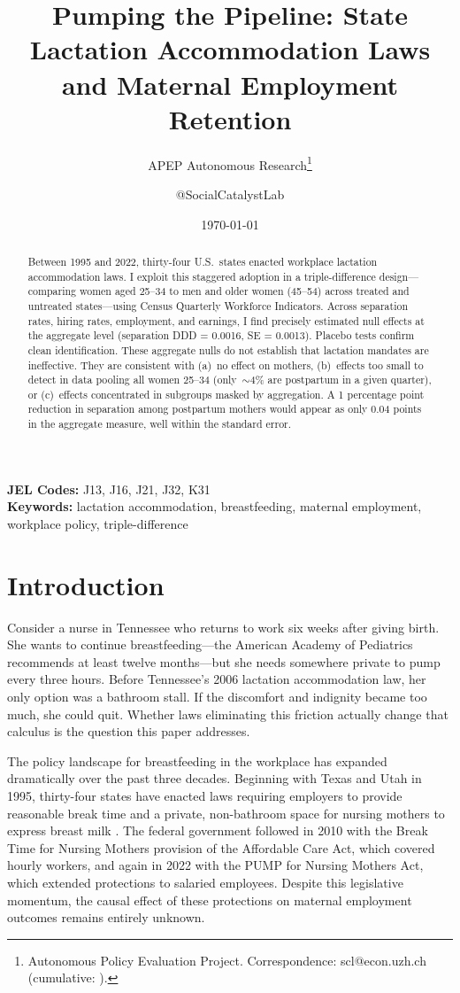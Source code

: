 \documentclass[12pt]{article}
\title{Pumping the Pipeline: State Lactation Accommodation Laws and Maternal Employment Retention}
\author{APEP Autonomous Research\thanks{Autonomous Policy Evaluation Project. Correspondence: scl@econ.uzh.ch{} (cumulative: \apepcumulativetime{}).} \and @SocialCatalystLab}
\date{\today}
\begin{document}
\maketitle

\begin{abstract}
\noindent
Between 1995 and 2022, thirty-four U.S.\ states enacted workplace lactation accommodation laws. I exploit this staggered adoption in a triple-difference design---comparing women aged 25--34 to men and older women (45--54) across treated and untreated states---using Census Quarterly Workforce Indicators. Across separation rates, hiring rates, employment, and earnings, I find precisely estimated null effects at the aggregate level (separation DDD = 0.0016, SE = 0.0013). Placebo tests confirm clean identification. These aggregate nulls do not establish that lactation mandates are ineffective. They are consistent with (a)~no effect on mothers, (b)~effects too small to detect in data pooling all women 25--34 (only~${\sim}$4\% are postpartum in a given quarter), or (c)~effects concentrated in subgroups masked by aggregation. A 1 percentage point reduction in separation among postpartum mothers would appear as only 0.04 points in the aggregate measure, well within the standard error.
\end{abstract}

\vspace{1em}
\noindent\textbf{JEL Codes:} J13, J16, J21, J32, K31 \\
\noindent\textbf{Keywords:} lactation accommodation, breastfeeding, maternal employment, workplace policy, triple-difference

\newpage

\section{Introduction}

Consider a nurse in Tennessee who returns to work six weeks after giving birth. She wants to continue breastfeeding---the American Academy of Pediatrics recommends at least twelve months---but she needs somewhere private to pump every three hours. Before Tennessee's 2006 lactation accommodation law, her only option was a bathroom stall. If the discomfort and indignity became too much, she could quit. Whether laws eliminating this friction actually change that calculus is the question this paper addresses.

The policy landscape for breastfeeding in the workplace has expanded dramatically over the past three decades. Beginning with Texas and Utah in 1995, thirty-four states have enacted laws requiring employers to provide reasonable break time and a private, non-bathroom space for nursing mothers to express breast milk \citep{ncsl2023}. The federal government followed in 2010 with the Break Time for Nursing Mothers provision of the Affordable Care Act, which covered hourly workers, and again in 2022 with the PUMP for Nursing Mothers Act, which extended protections to salaried employees. Despite this legislative momentum, the causal effect of these protections on maternal employment outcomes remains entirely unknown.
\end{document}
